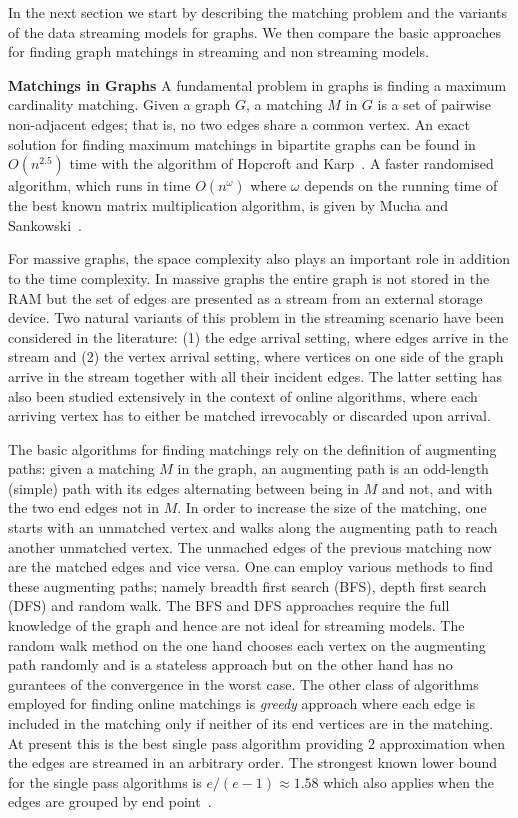 In the next section we start by describing the matching problem and the variants of the data streaming models for graphs. We then compare the basic approaches for finding graph matchings in streaming and non streaming models.

\textbf{Matchings in Graphs}
A fundamental problem in graphs is finding a maximum cardinality matching. Given a graph $G$, a matching $M$ in $G$ is a set of pairwise non-adjacent edges; that is, no two edges share a common vertex. An exact solution for finding maximum matchings in bipartite graphs can be found in $O(n^{2.5})$ time with the algorithm of Hopcroft and Karp~\cite{Hopcroft}. A faster randomised algorithm, which runs in time $O(n^{\omega})$ where $\omega$ depends on the running time of the best known matrix multiplication algorithm, is given by Mucha and Sankowski~\cite{MS04}. 

For massive graphs, the space complexity also plays an important role in addition to the time complexity. In massive graphs the entire graph is not stored in the RAM but the set of edges are presented as a stream from an external storage device. Two natural variants of this problem in the streaming scenario have been considered in the literature: (1) the edge arrival setting, where edges arrive in the stream and (2) the vertex arrival setting, where vertices on one
side of the graph arrive in the stream together with all their incident edges. The latter setting has also
been studied extensively in the context of online algorithms, where each arriving vertex has to either be
matched irrevocably or discarded upon arrival. 

The basic algorithms for finding matchings rely on the definition of augmenting paths:
given a matching $M$ in the graph, an augmenting path is an odd-length
(simple) path with its edges alternating between being in $M$
and not, and with the two end edges not in $M$. In order to increase the size of the matching, one starts with an unmatched vertex and walks along the augmenting path to reach another unmatched vertex. The unmached edges of the previous matching now are the matched edges and vice versa.
One can employ various methods to find these augmenting paths; namely breadth first search (BFS), depth first search (DFS) and random walk. The BFS and DFS approaches require the full knowledge of the graph and hence are not ideal for streaming models. The random walk method on the one hand chooses each vertex on the augmenting path randomly and is a stateless approach but on the other hand has no gurantees of the convergence in the worst case.
The other class of algorithms employed for finding online matchings is \emph{greedy} approach where each edge is included in the matching only if neither of its end vertices are in the matching. At present this is the best single pass algorithm providing $2$ approximation when the edges are streamed in an arbitrary order. The strongest known lower bound for the single pass algorithms is $e/(e-1)\approx 1.58$ which also applies when the edges are grouped by end point~\cite{boundsKap,Goel}.

